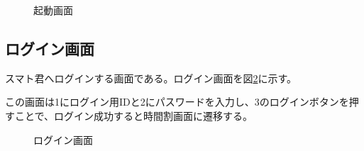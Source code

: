 \documentclass[a4j,12pt,onecolumn,oneside,titlepage,openany,final]{jreport}
\begin{document}
\begin{figure}[htbp]
  \centering %
  \caption{起動画面}\label{kido}
\end{figure}

\subsection{ログイン画面}
スマト君へログインする画面である。ログイン画面を図\ref{login}に示す。

この画面は1にログイン用IDと2にパスワードを入力し、3のログインボタンを押すことで、ログイン成功すると時間割画面に遷移する。


\begin{figure}[htbp]
  \centering %
  \caption{ログイン画面}\label{login}
\end{figure}
\end{document}
